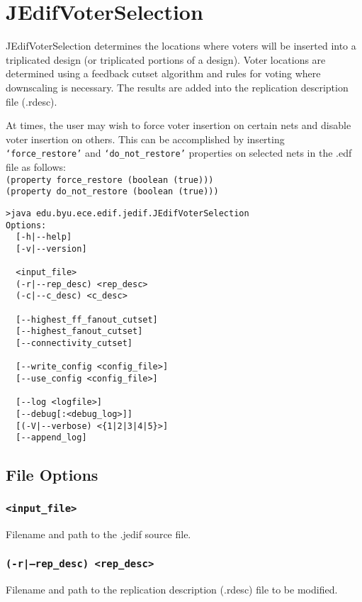\section{JEdifVoterSelection}
JEdifVoterSelection determines the locations where voters will be
inserted into a triplicated design (or triplicated portions of a
design). Voter locations are determined using a feedback cutset
algorithm and rules for voting where downscaling is necessary. The
results are added into the replication description file (.rdesc).

At times, the user may wish to force voter insertion on certain nets and
disable voter insertion on others. This can be accomplished by inserting
\texttt{`force\_restore'} and \texttt{`do\_not\_restore'} properties on
selected nets in the .edf file as follows:\\
\texttt{(property force\_restore (boolean (true)))}\\
\texttt{(property do\_not\_restore (boolean (true)))}\\
\begin{verbatim}
>java edu.byu.ece.edif.jedif.JEdifVoterSelection
Options:
  [-h|--help]
  [-v|--version]
  
  <input_file>
  (-r|--rep_desc) <rep_desc>
  (-c|--c_desc) <c_desc>

  [--highest_ff_fanout_cutset]
  [--highest_fanout_cutset]
  [--connectivity_cutset]

  [--write_config <config_file>]
  [--use_config <config_file>]

  [--log <logfile>]
  [--debug[:<debug_log>]]
  [(-V|--verbose) <{1|2|3|4|5}>]
  [--append_log]
\end{verbatim}
\subsection{File Options}

\subsubsection{\texttt{<input\_file>}}
Filename and path to the .jedif source file.

\subsubsection{\texttt{(-r|--rep\_desc) <rep\_desc>}}
Filename and path to the replication description (.rdesc) file to be modified.

